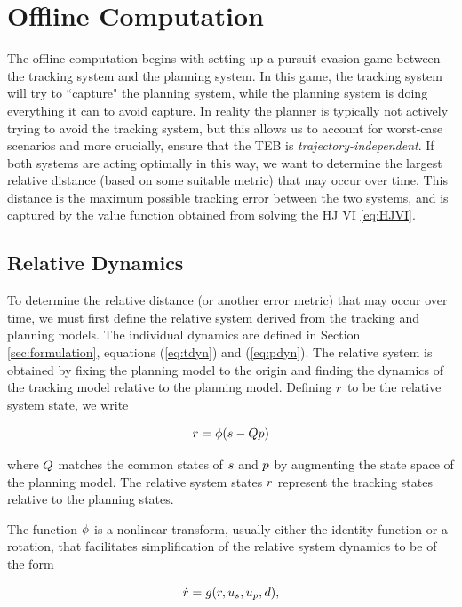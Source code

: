 \section{Offline Computation \label{sec:precomp}}
The offline computation begins with setting up a pursuit-evasion game \cite{Huang11, Chen17} between the tracking system and the planning system. 
In this game, the tracking system will try to ``capture" the planning system, while the planning system is doing everything it can to avoid capture. 
In reality the planner is typically not actively trying to avoid the tracking system, but this allows us to account for worst-case scenarios and more crucially, ensure that the TEB is \textit{trajectory-independent}. 
If both systems are acting optimally in this way, we want to determine the largest relative distance (based on some suitable metric) that may occur over time. 
This distance is the maximum possible tracking error between the two systems, and is captured by the value function obtained from solving the HJ VI \eqref{eq:HJVI}.

\subsection{Relative Dynamics}
To determine the relative distance (or another error metric) that may occur over time, we must first define the relative system derived from the tracking and planning models. 
The individual dynamics are defined in Section \ref{sec:formulation}, equations (\ref{eq:tdyn}) and (\ref{eq:pdyn}). 
The relative system is obtained by fixing the planning model to the origin and finding the dynamics of the tracking model relative to the planning model.
Defining $r$ to be the relative system state, we write

\begin{equation}
\label{eq:rstate}
\rstate = \rtrans(\tstate - \ptmat\pstate)
\end{equation}

\noindent where $Q$ matches the common states of $s$ and $p$ by augmenting the state space of the planning model.
The relative system states $r$ represent the tracking states relative to the planning states. 

The function $\phi$ is a nonlinear transform, usually either the identity function or a rotation, that facilitates simplification of the relative system dynamics to be of the form

\begin{equation}
\label{eq:rdyn}
\dot\rstate = \rdyn(\rstate, \tctrl, \pctrl, \dstb),
\end{equation}

